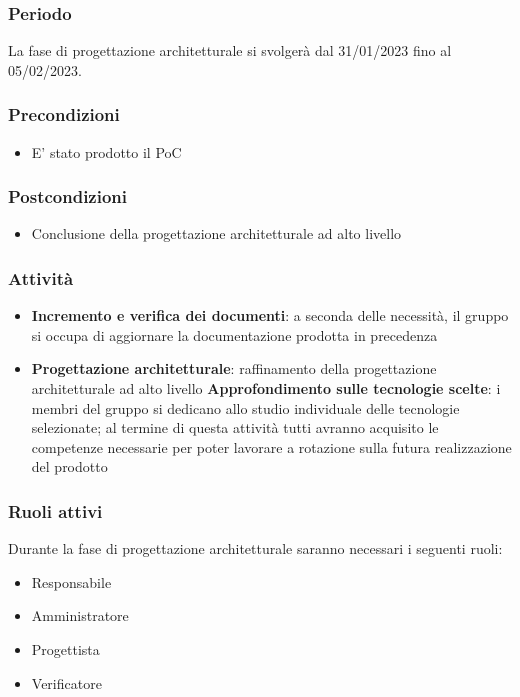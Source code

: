 \subsubsection{Periodo}
La fase di progettazione architetturale si svolgerà dal 31/01/2023 fino al 05/02/2023.

\subsubsection{Precondizioni}
\begin{itemize}
    \item E’ stato prodotto il PoC
\end{itemize}

\subsubsection{Postcondizioni}
\begin{itemize}
    \item Conclusione della progettazione architetturale ad alto livello
\end{itemize}

\subsubsection{Attività}
\begin{itemize}
    \item \textbf{Incremento e verifica dei documenti}: a seconda delle necessità, il gruppo si occupa di aggiornare la documentazione prodotta in precedenza
    \item \textbf{Progettazione architetturale}: raffinamento della progettazione architetturale ad alto livello
        \subitem \textbf{Approfondimento sulle tecnologie scelte}: i membri del gruppo si dedicano allo studio individuale delle tecnologie selezionate; al termine di questa attività tutti avranno acquisito le competenze necessarie per poter lavorare a rotazione sulla futura realizzazione del prodotto
\end{itemize}

\subsubsection{Ruoli attivi}
Durante la fase di progettazione architetturale saranno necessari i seguenti ruoli:
\begin{itemize}
	\item Responsabile
    \item Amministratore
    \item Progettista
    \item Verificatore
\end{itemize}

